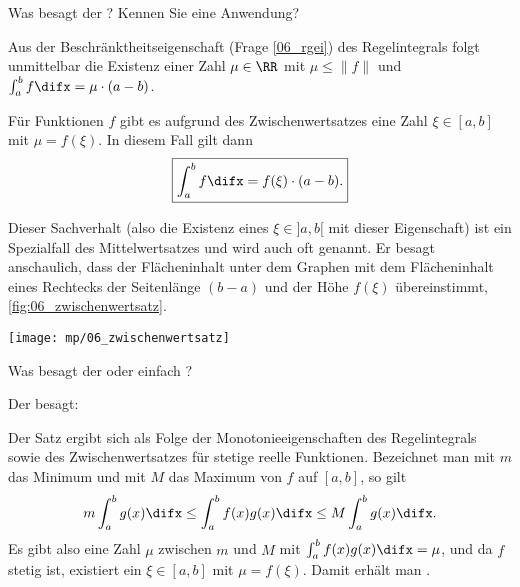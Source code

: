 \begin{frage}
Was besagt der 
? Kennen Sie eine 
Anwendung?
\end{frage}

\begin{antwort}
Aus der Beschränktheitseigenschaft (Frage \ref{06_rgei}) 
des Regelintegrals folgt unmittelbar die Existenz einer Zahl 
$\mu\in\RR$ mit $\mu \le \| f \|$ und 
$\int_a^b f \difx = \mu \cdot (a-b)$.

Für  Funktionen $f$ gibt es aufgrund des 
Zwischenwertsatzes eine Zahl $\xi\in [a,b]$ mit $\mu=f(\xi)$. In diesem 
Fall gilt dann 
\[
\boxed{ \int_a^b f \difx = f(\xi) \cdot (a-b). }
\]
\noindent

Dieser Sachverhalt 
(also die Existenz eines $\xi\in ]a,b[$ mit dieser Eigenschaft) ist ein 
Spezialfall des Mittelwertsatzes und wird auch oft 
 genannt. Er besagt anschaulich, dass 
der Flächeninhalt unter dem Graphen mit dem Flächeninhalt eines 
Rechtecks der Seitenlänge $(b-a)$ und der Höhe $f(\xi)$ übereinstimmt, 
\sieheAbbildung\ref{fig:06_zwischenwertsatz}. \AntEnd

\begin{center}
  \texttt{[image: mp/06\_zwischenwertsatz]}
  \label{fig:06_zwischenwertsatz}
\end{center} 
\end{antwort}

\begin{frage}\label{06_allgmittelwertsatz}
Was besagt der 
 oder 
einfach ? 
\end{frage}

\begin{antwort}
 Der  besagt: 

\medskip
\noindent{}

\medskip\noindent
Der Satz ergibt sich als 
Folge der Monotonieeigenschaften des Regelintegrals sowie  
des Zwischenwertsatzes für stetige reelle Funktionen. Bezeichnet man mit 
$m$ das Minimum und mit $M$ das Maximum von $f$ auf $[a,b]$, so gilt 
\[
m \int_a^b g(x) \difx \le \int_a^b f(x)g(x)\difx \le 
M \int_a^b g(x) \difx.
\]
Es gibt also eine Zahl $\mu$ zwischen $m$ und $M$ mit 
$\int_a^b f(x)g(x)\difx = \mu$, und da $f$ stetig ist, existiert 
ein $\xi\in [a,b]$ mit $\mu=f(\xi)$. Damit erhält man {\astref}. 
\AntEnd 
\end{antwort} 


